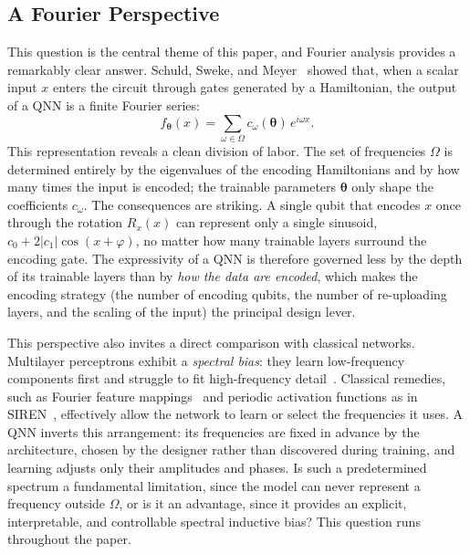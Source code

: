 \documentclass[12pt]{article}
\numberwithin{equation}{section}  %
\begin{document}
\subsection{A Fourier Perspective}
\label{sec:intro_fourier}

This question is the central theme of this paper, and Fourier analysis provides a remarkably clear answer. Schuld, Sweke, and Meyer~\cite{schuld2021effect} showed that, when a scalar input $x$ enters the circuit through gates generated by a Hamiltonian, the output of a QNN is a finite Fourier series:
\begin{equation}
f_{\boldsymbol{\theta}}(x) = \sum_{\omega \in \Omega} c_\omega(\boldsymbol{\theta})\, e^{i\omega x}.
\label{eq:intro_fourier}
\end{equation}
This representation reveals a clean division of labor. The set of frequencies $\Omega$ is determined entirely by the eigenvalues of the encoding Hamiltonians and by how many times the input is encoded; the trainable parameters $\boldsymbol{\theta}$ only shape the coefficients $c_\omega$. The consequences are striking. A single qubit that encodes $x$ once through the rotation $R_x(x)$ can represent only a single sinusoid, $c_0 + 2|c_1|\cos(x + \varphi)$, no matter how many trainable layers surround the encoding gate. The expressivity of a QNN is therefore governed less by the depth of its trainable layers than by \emph{how the data are encoded}, which makes the encoding strategy (the number of encoding qubits, the number of re-uploading layers, and the scaling of the input) the principal design lever.

This perspective also invites a direct comparison with classical networks. Multilayer perceptrons exhibit a \emph{spectral bias}: they learn low-frequency components first and struggle to fit high-frequency detail~\cite{rahaman2019spectral}. Classical remedies, such as Fourier feature mappings~\cite{tancik2020fourier} and periodic activation functions as in SIREN~\cite{sitzmann2020implicit}, effectively allow the network to learn or select the frequencies it uses. A QNN inverts this arrangement: its frequencies are fixed in advance by the architecture, chosen by the designer rather than discovered during training, and learning adjusts only their amplitudes and phases. Is such a predetermined spectrum a fundamental limitation, since the model can never represent a frequency outside $\Omega$, or is it an advantage, since it provides an explicit, interpretable, and controllable spectral inductive bias? This question runs throughout the paper.
\end{document}
